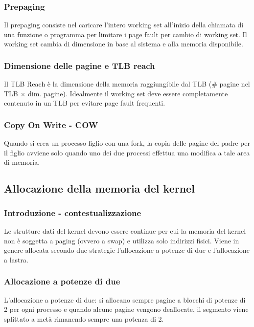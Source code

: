 \documentclass[a4paper]{article}
\begin{document}
\subsubsection*{Prepaging}
Il prepaging consiste nel caricare l'intero working set all'inizio della chiamata di una funzione o programma per limitare
i page fault per cambio di working set. Il working set cambia di dimensione in base al sistema e alla memoria disponibile.

\subsubsection*{Dimensione delle pagine e TLB reach}
Il TLB Reach è la dimensione della memoria raggiungibile dal TLB (\# pagine nel TLB \(\times\) dim. pagine). Idealmente il
working set deve essere completamente contenuto in un TLB per evitare page fault frequenti.

\subsubsection*{Copy On Write - COW}
Quando si crea un processo figlio con una fork, la copia delle pagine del padre per il figlio avviene solo quando uno dei due
processi effettua una modifica a tale area di memoria.


\subsection{Allocazione della memoria del kernel}
\subsubsection*{Introduzione - contestualizzazione}
Le strutture dati del kernel devono essere continue per cui la memoria del kernel non è soggetta a paging (ovvero a swap) e
utilizza solo indirizzi fisici. Viene in genere allocata secondo due strategie l'allocazione a potenze di due e l'allocazione
a lastra.

\subsubsection*{Allocazione a potenze di due}
L'allocazione a potenze di due: si allocano sempre pagine a blocchi di potenze di 2 per ogni processo e quando alcune
pagine vengono deallocate, il segmento viene splittato a metà rimanendo sempre una potenza di 2.
\end{document}
